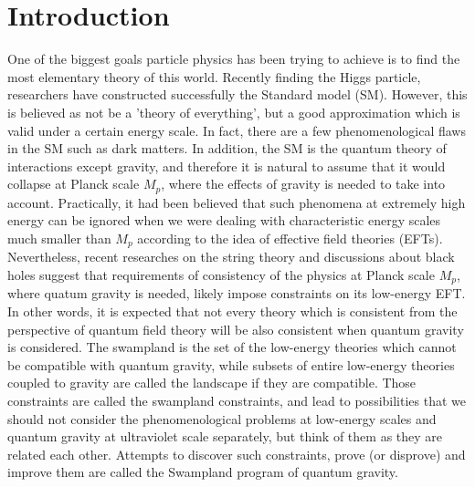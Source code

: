 \chapter{Introduction}
\label{Introduction}

One of the biggest goals particle physics has been trying to achieve is to find the most elementary theory of this world. Recently finding the Higgs particle, researchers have constructed successfully the Standard model (SM). However, this is believed as not be a 'theory of everything', but a good approximation which is valid under a certain energy scale. In fact, there are a few phenomenological flaws in the SM such as dark matters. In addition, the SM is the quantum theory of interactions except gravity, and therefore it is natural to assume that it would collapse at Planck scale $M_{p}$, where the effects of gravity is needed to take into account. Practically, it had been believed that such phenomena at extremely high energy can be ignored when we were dealing with characteristic energy scales much smaller than $M_{p}$ according to the idea of effective field theories (EFTs). \\
\indent Nevertheless, recent researches on the string theory and discussions about black holes suggest that requirements of consistency of the physics at Planck scale $M_{p}$, where quatum gravity is needed, likely impose constraints on its low-energy EFT. In other words, it is expected that not every theory which is consistent from the perspective of quantum field theory will be also consistent when quantum gravity is considered. The swampland is the set of the low-energy theories which cannot be compatible with quantum gravity, while subsets of entire low-energy theories coupled to gravity are called the landscape if they are compatible. Those constraints are called the swampland constraints, and lead to possibilities that we should not consider the phenomenological problems at low-energy scales and quantum gravity at ultraviolet scale separately, but think of them as they are related each other. Attempts to discover such constraints, prove (or disprove) and improve them are called the Swampland program of quantum gravity. \\
